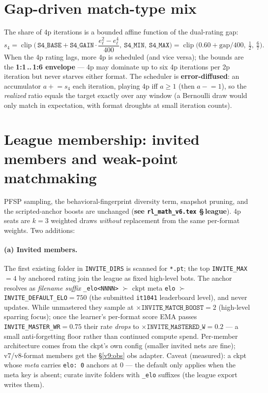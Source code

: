 \documentclass[11pt]{article}
\newcommand{\clip}{\operatorname{clip}}
\newcommand{\cd}[1]{\texttt{#1}}
\newcommand{\vsixref}[1]{\textbf{see \texttt{rl\_math\_v6.tex} \S\,#1}}
\begin{document}
\section{Gap-driven match-type mix}\label{v9:mix}
The share of 4p iterations is a bounded affine function of the dual-rating gap:
\begin{equation}
s_4=\clip\!\Big(\,\cd{S4\_BASE}+\cd{S4\_GAIN}\cdot\frac{e^2_\ell-e^4_\ell}{400},\ \cd{S4\_MIN},\ \cd{S4\_MAX}\Big)
=\clip\big(0.60+\text{gap}/400,\ \tfrac12,\ \tfrac67\big).
\label{v9:share}
\end{equation}
When the 4p rating lags, more 4p is scheduled (and vice versa); the bounds are the
\textbf{1:1\,..\,1:6 envelope} --- 4p may dominate up to six 4p iterations per 2p iteration but
never starves either format. The scheduler is \textbf{error-diffused}: an accumulator
$a\mathrel{+}=s_4$ each iteration, playing 4p iff $a\ge1$ (then $a\mathrel{-}=1$), so the
\emph{realized} ratio equals the target exactly over any window (a Bernoulli draw would only match
in expectation, with format droughts at small iteration counts).

\section{League membership: invited members and weak-point matchmaking}\label{v9:members}
PFSP sampling, the behavioral-fingerprint diversity term, snapshot pruning, and the scripted-anchor
boosts are unchanged (\vsixref{league}). 4p seats are $k{=}3$ weighted draws \emph{without}
replacement from the same per-format weights. Two additions:

\paragraph{(a) Invited members.} The first existing folder in \cd{INVITE\_DIRS} is scanned for
\cd{*.pt}; the top \cd{INVITE\_MAX}$=4$ by anchored rating join the league as fixed high-level
bots. The anchor resolves as \emph{filename suffix} \cd{\_elo<NNNN>} $\succ$ ckpt meta \cd{elo}
$\succ$ \cd{INVITE\_DEFAULT\_ELO}$=750$ (the submitted \cd{it1041} leaderboard level), and never
updates. While unmastered they sample at $\times\cd{INVITE\_MATCH\_BOOST}{=}2$ (high-level
sparring focus); once the learner's per-format score EMA passes \cd{INVITE\_MASTER\_WR}$=0.75$
their rate \emph{drops} to $\times\cd{INVITE\_MASTERED\_W}{=}0.2$ --- a small anti-forgetting
floor rather than continued compute spend. Per-member architecture comes from the ckpt's own
config (smaller invited nets are fine); v7/v8-format members get the \S\ref{v9:obs} obs adapter.
Caveat (measured): a ckpt whose \emph{meta} carries \cd{elo:\,0} anchors at 0 --- the default only
applies when the meta key is absent; curate invite folders with \cd{\_elo} suffixes (the league
export writes them).
\end{document}
